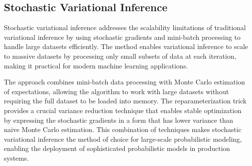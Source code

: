 \subsection{Stochastic Variational Inference}

Stochastic variational inference addresses the scalability limitations of traditional variational inference by using stochastic gradients and mini-batch processing to handle large datasets efficiently. The method enables variational inference to scale to massive datasets by processing only small subsets of data at each iteration, making it practical for modern machine learning applications.

The approach combines mini-batch data processing with Monte Carlo estimation of expectations, allowing the algorithm to work with large datasets without requiring the full dataset to be loaded into memory. The reparameterization trick provides a crucial variance reduction technique that enables stable optimization by expressing the stochastic gradients in a form that has lower variance than naive Monte Carlo estimation. This combination of techniques makes stochastic variational inference the method of choice for large-scale probabilistic modeling, enabling the deployment of sophisticated probabilistic models in production systems.





